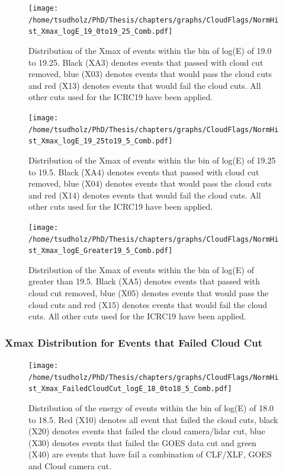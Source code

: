 \begin{figure}
\centering
\texttt{[image: /home/tsudholz/PhD/Thesis/chapters/graphs/CloudFlags/NormHist\_Xmax\_logE\_19\_0to19\_25\_Comb.pdf]}
\caption{Distribution of the Xmax of events within the bin of log(E) of 19.0 to 19.25. Black (XA3) denotes events that passed with cloud cut removed, blue (X03) denotes events that would pass the cloud cuts and red (X13) denotes events that would fail the cloud cuts. All other cuts used for the ICRC19 have been applied.}
\end{figure}

\begin{figure}
\centering
\texttt{[image: /home/tsudholz/PhD/Thesis/chapters/graphs/CloudFlags/NormHist\_Xmax\_logE\_19\_25to19\_5\_Comb.pdf]}
\caption{Distribution of the Xmax of events within the bin of log(E) of 19.25 to 19.5. Black (XA4) denotes events that passed with cloud cut removed, blue (X04) denotes events that would pass the cloud cuts and red (X14) denotes events that would fail the cloud cuts. All other cuts used for the ICRC19 have been applied.}
\end{figure}

\begin{figure}
\centering
\texttt{[image: /home/tsudholz/PhD/Thesis/chapters/graphs/CloudFlags/NormHist\_Xmax\_logE\_Greater19\_5\_Comb.pdf]}
\caption{Distribution of the Xmax of events within the bin of log(E) of greater than 19.5. Black (XA5) denotes events that passed with cloud cut removed, blue (X05) denotes events that would pass the cloud cuts and red (X15) denotes events that would fail the cloud cuts. All other cuts used for the ICRC19 have been applied.}
\end{figure}


\subsubsection{Xmax Distribution for Events that Failed Cloud Cut}

\begin{figure}
\centering
\texttt{[image: /home/tsudholz/PhD/Thesis/chapters/graphs/CloudFlags/NormHist\_Xmax\_FailedCloudCut\_logE\_18\_0to18\_5\_Comb.pdf]}
\caption{Distribution of the energy of events within the bin of log(E) of 18.0 to 18.5. Red (X10) denotes all event that failed the cloud cuts, black (X20) denotes events that failed the cloud camera/lidar cut, blue (X30) denotes events that failed the GOES data cut and green (X40) are events that have fail a combination of CLF/XLF, GOES and Cloud camera cut.}
\end{figure}

